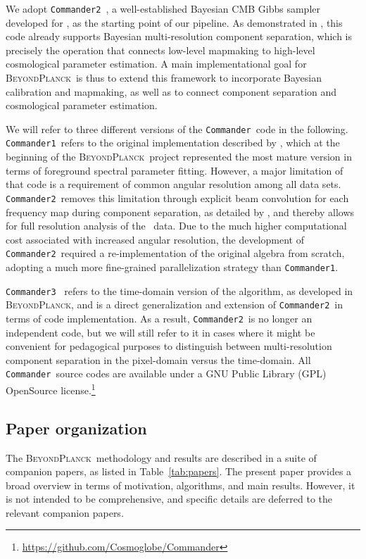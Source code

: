 \documentclass[twocolumn]{aa}
\def\commander{\texttt{Commander}}
\def\commanderone{\texttt{Commander1}}
\def\commandertwo{\texttt{Commander2}}
\def\commanderthree{\texttt{Commander3}}
\newcommand{\BP}{\textsc{BeyondPlanck}}
\begin{document}
We adopt
\commandertwo\ \citep{eriksen:2004,eriksen2008,seljebotn:2019}, a
well-established Bayesian CMB Gibbs sampler developed for \Planck, as
the starting point of our pipeline. As demonstrated in
\citet{planck2016-l04}, this code already supports Bayesian
multi-resolution component separation, which is precisely the
operation that connects low-level mapmaking to high-level cosmological
parameter estimation. A main implementational goal for \BP\ is thus to
extend this framework to incorporate Bayesian calibration and
mapmaking, as well as to connect component separation and cosmological
parameter estimation.

We will refer to three different versions of the \commander\ code in
the following. \commanderone\ refers to the original implementation
described by \citet{eriksen:2004,eriksen2008}, which at the beginning
of the \BP\ project represented the most mature version in terms of
foreground spectral parameter fitting. However, a major limitation of
that code is a requirement of common angular resolution among all data
sets. \commandertwo\ removes this limitation through explicit beam
convolution for each frequency map during component separation, as
detailed by \citet{seljebotn:2019}, and thereby allows for full
resolution analysis of the \Planck\ data. Due to the much higher
computational cost associated with increased angular resolution, the
development of \commandertwo\ required a re-implementation of the
original algebra from scratch, adopting a much more fine-grained
parallelization strategy than \commanderone.

\commanderthree\ \citep{bp03} refers to the time-domain version of the
algorithm, as developed in \BP, and is a direct generalization and
extension of \commandertwo\ in terms of code implementation. As a
result, \commandertwo\ is no longer an independent code, but we will
still refer to it in cases where it might be convenient for
pedagogical purposes to distinguish between multi-resolution component
separation in the pixel-domain versus the time-domain. All
\commander\ source codes are available under a GNU Public Library
(GPL) OpenSource
license.\footnote{\url{https://github.com/Cosmoglobe/Commander}}

\subsection{Paper organization}
\label{sec:papers}

The \BP\ methodology and results are described in a suite of companion
papers, as listed in Table~\ref{tab:papers}. The present paper
provides a broad overview in terms of motivation, algorithms, and main
results. However, it is not intended to be comprehensive, and specific
details are deferred to the relevant companion papers.
\end{document}
